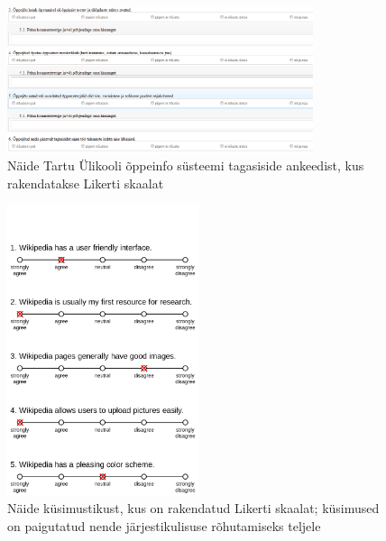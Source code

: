 \documentclass[a4paper]{article}
\numberwithin{equation}{section}
\theoremstyle{definition}
\begin{document}
\begin{figure}[H]
\centering
\includegraphics[width=0.8\textwidth]{ois_tagasiside_toodeldud.png}
\caption{Näide Tartu \"Ulikooli õppeinfo s\"usteemi tagasiside ankeedist, kus rakendatakse Likerti skaalat \cite{UT}}
\label{likert1}
\end{figure}

\begin{figure}[H]
\centering
\includegraphics[width=0.5\textwidth, height = 0.7\textwidth]{Example_Likert_Scale.png}
\caption{Näide k\"usimustikust, kus on rakendatud Likerti skaalat; k\"usimused on paigutatud nende järjestikulisuse rõhutamiseks teljele\cite{Smith}}
\label{likert2}
\end{figure}



\pagebreak
{}

\end{document}
